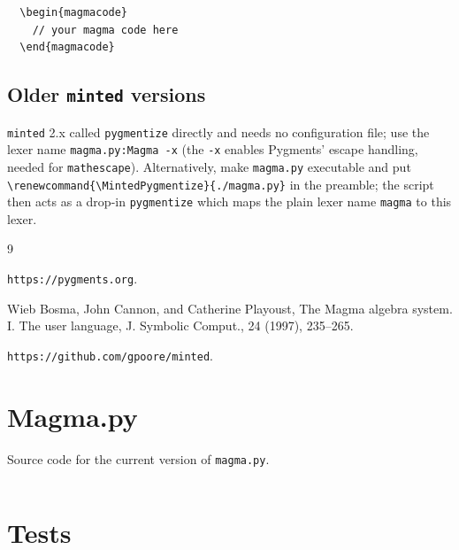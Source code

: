 \documentclass{article}
\begin{document}
\begin{verbatim}
  \begin{magmacode}
    // your magma code here
  \end{magmacode}
\end{verbatim}


\subsection{Older \texttt{minted} versions}

\texttt{minted} 2.x called \texttt{pygmentize} directly and needs no
configuration file; use the lexer name \texttt{magma.py:Magma -x}
(the \texttt{-x} enables Pygments' escape handling, needed for
\texttt{mathescape}). Alternatively, make \texttt{magma.py} executable
and put \verb|\renewcommand{\MintedPygmentize}{./magma.py}| in the
preamble; the script then acts as a drop-in \texttt{pygmentize}
which maps the plain lexer name \texttt{magma} to this lexer.


\begin{thebibliography}{9}

 \texttt{https://pygments.org}.

 Wieb Bosma, John Cannon, and Catherine Playoust, The
  Magma algebra system. I. The user language, J. Symbolic Comput., 24
  (1997), 235–265.

 \texttt{https://github.com/gpoore/minted}.

\end{thebibliography}

\appendix

\section{Magma.py}

Source code for the current version of \texttt{magma.py}.

\inputminted{python}{magma.py}


\section{Tests}

\def\SL{\mathop{\mathrm{SL}}}
\end{document}
